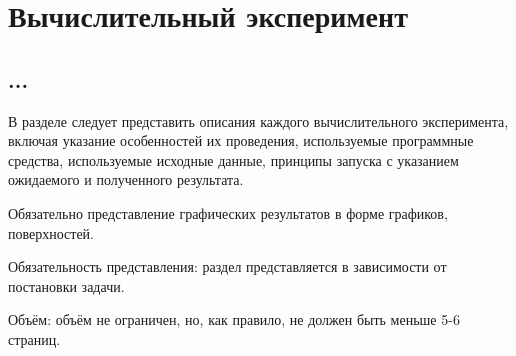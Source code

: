 \chapter{Вычислительный эксперимент}\label{chap5_comp_experiment}
\section{...}

В разделе следует представить описания каждого вычислительного эксперимента, включая указание особенностей их проведения, используемые программные средства, используемые исходные данные, принципы запуска с указанием ожидаемого и полученного результата.

Обязательно представление графических результатов в форме графиков, поверхностей.

Обязательность представления: раздел представляется в зависимости от постановки задачи.

Объём: объём не ограничен, но, как правило, не должен быть меньше 5-6 страниц.



